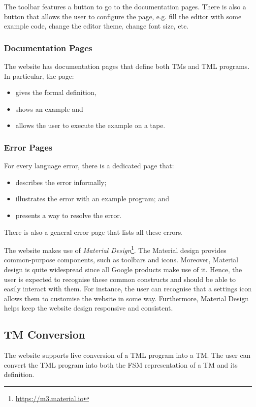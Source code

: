 The toolbar features a button to go to the documentation pages. There is also a button that allows the user to configure the page, e.g. fill the editor with some example code, change the editor theme, change font size, etc. 

\subsubsection{Documentation Pages}
The website has documentation pages that define both TMs and TML programs. In particular, the page:
\begin{itemize}
    \item gives the formal definition, 
    \item shows an example and 
    \item allows the user to execute the example on a tape.
\end{itemize}

\subsubsection{Error Pages}
For every language error, there is a dedicated page that:
\begin{itemize}
    \item describes the error informally;
    \item illustrates the error with an example program; and 
    \item presents a way to resolve the error.
\end{itemize}
There is also a general error page that lists all these errors.

The website makes use of \emph{Material Design}\footnote{\url{https://m3.material.io}}. The Material design provides common-purpose components, such as toolbars and icons. Moreover, Material design is quite widespread since all Google products make use of it. Hence, the user is expected to recognise these common constructs and should be able to easily interact with them. For instance, the user can recognise that a settings icon allows them to customise the website in some way. Furthermore, Material Design helps keep the website design responsive and consistent.

\subsection{TM Conversion}
The website supports live conversion of a TML program into a TM. The user can convert the TML program into both the FSM representation of a TM and its definition.

